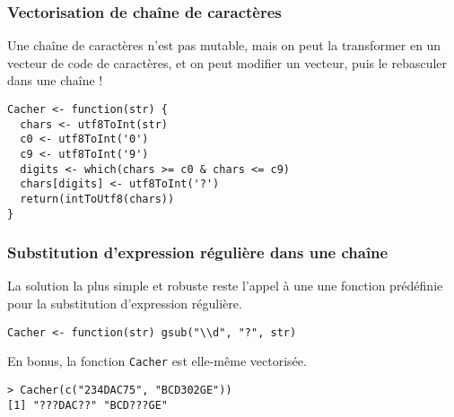 \documentclass[10pt]{beamer}
\begin{document}
\begin{frame}[fragile]
  \frametitle{Vectorisation de chaîne de caractères}

  Une chaîne de caractères n’est pas mutable, mais on peut la transformer en un vecteur de code de caractères, et on peut modifier un vecteur, puis le rebasculer dans une chaîne !

  \begin{lstlisting}[style=editor]
Cacher <- function(str) {
  chars <- utf8ToInt(str)
  c0 <- utf8ToInt('0')
  c9 <- utf8ToInt('9')
  digits <- which(chars >= c0 & chars <= c9)
  chars[digits] <- utf8ToInt('?')
  return(intToUtf8(chars))
}
\end{lstlisting}


\end{frame}

\begin{frame}[fragile]
  \frametitle{Substitution d'expression régulière dans une chaîne}

  La solution la plus simple et robuste reste l'appel à une une fonction prédéfinie pour la substitution d'expression régulière.

\begin{lstlisting}[style=edblock]
Cacher <- function(str) gsub("\\d", "?", str)
\end{lstlisting}

En bonus, la fonction \texttt{Cacher} est elle-même vectorisée.
\begin{lstlisting}
> Cacher(c("234DAC75", "BCD302GE"))
[1] "???DAC??" "BCD???GE"
\end{lstlisting}

\end{frame}
\end{document}
